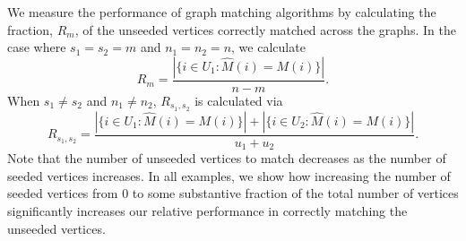 \documentclass[12pt]{article}
\numberwithin{equation}{section}
\theoremstyle{definition}
\begin{document}
We measure the performance of graph matching algorithms by calculating the fraction, $R_m$, of the unseeded vertices correctly matched across the graphs.  In the case where $s_1=s_2=m$ and $n_1=n_2=n$, we calculate
\begin{equation}
\label{matchrat2}
R_m=\frac{|\{i\in U_1:\widehat{M}(i) = M(i)\}|}{n-m}.
\end{equation}
When $s_1\neq s_2$ and $n_1\neq n_2$, $R_{s_1,s_2}$ is calculated via
$$R_{s_1,s_2}=\frac{|\{i\in U_1:\widehat{M}(i) = M(i)\}|+|\{i\in
        U_2:\widehat{M}(i) = M(i)\}|}{u_1+u_2}.$$
Note that the number of unseeded vertices to match decreases as the number of seeded vertices increases.  In all examples, we show how increasing the number of seeded vertices from 0 to some substantive fraction of the total number of vertices significantly increases our relative performance in correctly matching the unseeded vertices.
\end{document}
